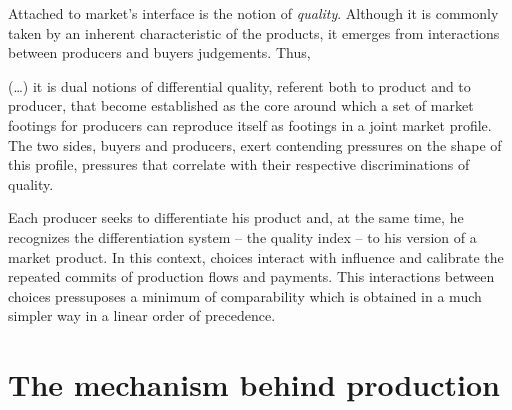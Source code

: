 \documentclass[a4paper, 12pt, openright, oneside, german, french, brazil, english]{abntex2}
\begin{document}
	
	Attached to market's interface is the notion of \textit{quality}. Although it is commonly taken by an inherent characteristic of the products, it emerges from interactions between producers and buyers judgements. Thus, 
	
	\begin{citacao}
	(\dots) it is dual notions of differential quality, referent both to product and to producer, that become established as the core around which a set of market footings for producers can reproduce itself as footings in a joint market profile. The two sides, buyers and producers, exert contending pressures on the shape of this profile, pressures that correlate with their respective discriminations of quality. \cite[p. 10]{white2002markets}
	\end{citacao}
	
	
	Each producer seeks to differentiate his product and, at the same time, he recognizes the differentiation system -- the quality index -- to his version of a market product. In this context, choices interact with influence and calibrate the repeated commits of production flows and payments. This interactions between choices pressuposes a minimum of comparability which is obtained in a much simpler way in a linear order of precedence.
	
	\section{The mechanism behind production}
	
	
\end{document}
